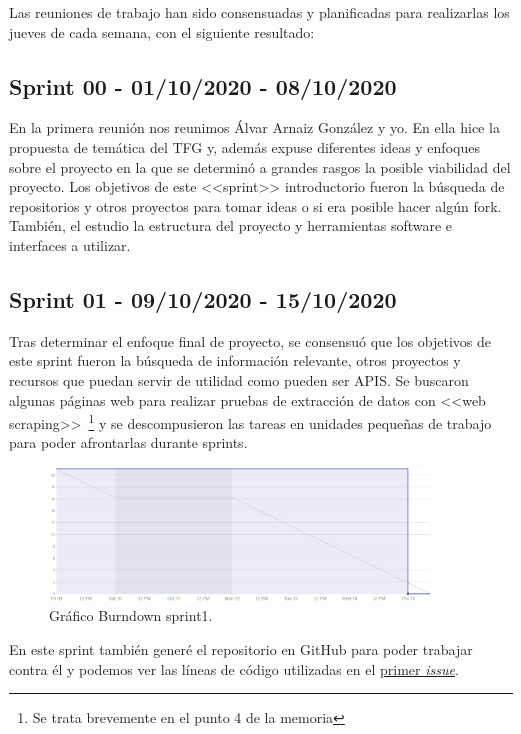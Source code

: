 Las reuniones de trabajo han sido consensuadas y planificadas para realizarlas los jueves de cada semana, con el siguiente resultado:

\subsection{Sprint 00 - 01/10/2020 - 08/10/2020}
En la primera reunión nos reunimos Álvar Arnaiz González y yo. En ella hice la propuesta de temática del TFG y, además expuse diferentes ideas y enfoques sobre el proyecto en la que se determinó a grandes rasgos la posible viabilidad del proyecto.
Los objetivos de este <<sprint>> introductorio fueron la búsqueda de repositorios y otros proyectos para tomar ideas o si era posible hacer algún fork. También, el estudio la estructura del proyecto y herramientas software e interfaces a utilizar.

\subsection{Sprint 01 - 09/10/2020 - 15/10/2020}
Tras determinar el enfoque final de proyecto, se consensuó que los objetivos de este sprint fueron la búsqueda de información relevante, otros proyectos y recursos que puedan servir de utilidad como pueden ser APIS. Se buscaron algunas páginas web para realizar pruebas de extracción de datos con <<web scraping>>~\footnote{Se trata brevemente en el punto 4 de la memoria} y se descompusieron las tareas en unidades pequeñas de trabajo para poder afrontarlas durante sprints.

\begin{figure}[h]
    \centering
    \includegraphics[width=0.9\textwidth]{img/BurnDown/1.PNG}
    \caption{Gráfico Burndown sprint1. } \label{BD1}
\end{figure}    

En este sprint también generé el repositorio en GitHub para poder trabajar contra él y podemos ver las líneas de código utilizadas en el \href{https://github.com/davidelinformatico/TFG/issues/1}{primer \textit{issue}}.

